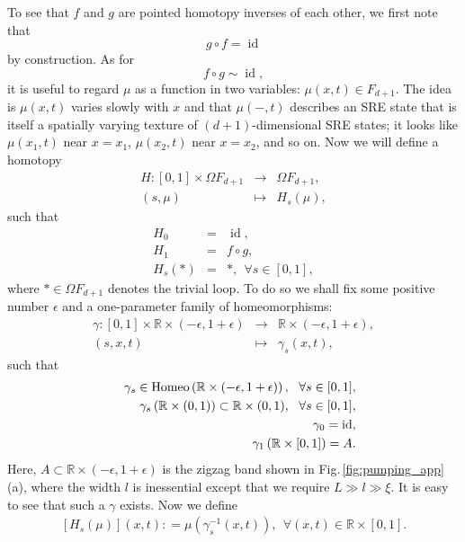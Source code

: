 \documentclass[sort&compress]{elsarticle}
\theoremstyle{theoremstyle}
\theoremstyle{framedtheoremstyle}
\theoremstyle{definitionstyle}
\theoremstyle{definitionstyle}
\theoremstyle{definitionstyle}
\theoremstyle{definitionstyle}
\theoremstyle{nameddefinitionstyle}
\theoremstyle{framednameddefinitionstyle}
\theoremstyle{proofstyle}
\theoremstyle{definitionstyle}
\newcommand{\fromto}{\rightarrow}
\newcommand{\RRR}{\mathbb{R}}
\DeclareMathOperator{\identity}{id}
\newcommand{\coloneq}{\mathrel{\mathop:}=}
\newcommand{\paren}[1]{\left( #1 \right)}
\newcommand{\brackets}[1]{\left[ #1 \right]}
\begin{document}
\begin{appendices}
To see that $f$ and $g$ are pointed homotopy inverses of each other, we first note that
\begin{equation}
g \circ f = \identity
\end{equation}
by construction. As for
\begin{equation}
f \circ g \sim \identity,
\end{equation}
it is useful to regard $\mu$ as a function in two variables: $\mu(x,t) \in F_{d+1}$. The idea is $\mu(x,t)$ varies slowly with $x$ and that $\mu(-,t)$ describes an SRE state that is itself a spatially varying texture of $(d+1)$-dimensional SRE states; it looks like $\mu(x_1,t)$ near $x = x_1$, $\mu(x_2, t)$ near $x = x_2$, and so on. Now we will define a homotopy
\begin{eqnarray}
H: [0,1] \times \Omega F_{d+1} &\fromto& \Omega F_{d+1}, \nonumber\\
(s, \mu) &\mapsto& H_s(\mu), \label{homotopy_H}
\end{eqnarray}
such that
\begin{eqnarray}
H_0 &=& \identity, \\
H_1 &=& f\circ g, \\
H_s(\ast) &=& \ast, ~~ \forall s\in [0,1],
\end{eqnarray}
where $\ast \in \Omega F_{d+1}$ denotes the trivial loop. To do so we shall fix some positive number $\epsilon$ and a one-parameter family of homeomorphisms:
\begin{eqnarray}
\gamma: [0,1] \times \RRR \times (-\epsilon, 1+\epsilon) &\fromto& \RRR \times (-\epsilon, 1+\epsilon), \nonumber\\
(s, x, t) &\mapsto& \gamma_s(x,t),
\end{eqnarray}
such that
\begin{eqnarray}
&& \gamma_s \in {\rm Homeo}\paren{ \RRR \times (-\epsilon, 1+\epsilon) }, ~~ \forall s\in [0,1], \\
&& \gamma_s \paren{ \RRR \times (0,1) } \subset \RRR \times (0,1), ~~ \forall s\in [0,1], \\
&& \gamma_0 = \identity, \\
&& \gamma_1\paren{ \RRR \times [0,1] } = A.
\end{eqnarray}
Here, $A \subset \RRR \times (-\epsilon, 1+\epsilon)$ is the zigzag band shown in Fig.\,\ref{fig:pumping_app}(a), where the width $l$ is inessential except that we require $L \gg l \gg \xi$. It is easy to see that such a $\gamma$ exists. Now we define
\begin{eqnarray}
\brackets{H_s(\mu)}(x,t) \coloneq \mu \paren{ \gamma_s^{-1}(x,t) }, ~~ \forall (x,t) \in \RRR \times [0,1].
\end{eqnarray}


\end{appendices}
\end{document}

